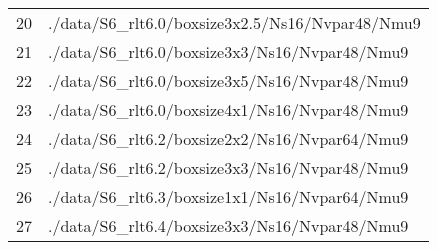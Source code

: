 \begin{center}
\begin{tabular}{l | l }
        20  & ./data/S6\_rlt6.0/boxsize3x2.5/Ns16/Nvpar48/Nmu9                  \\ 
        21  & ./data/S6\_rlt6.0/boxsize3x3/Ns16/Nvpar48/Nmu9                    \\ 
        22  & ./data/S6\_rlt6.0/boxsize3x5/Ns16/Nvpar48/Nmu9                    \\ 
        23  & ./data/S6\_rlt6.0/boxsize4x1/Ns16/Nvpar48/Nmu9                    \\ 
        24  & ./data/S6\_rlt6.2/boxsize2x2/Ns16/Nvpar64/Nmu9                    \\ 
        25  & ./data/S6\_rlt6.2/boxsize3x3/Ns16/Nvpar48/Nmu9                    \\ 
        26  & ./data/S6\_rlt6.3/boxsize1x1/Ns16/Nvpar64/Nmu9                    \\ 
        27  & ./data/S6\_rlt6.4/boxsize3x3/Ns16/Nvpar48/Nmu9                    \\ 
    \end{tabular}
    \label{tab:parametersPath}
\end{center}